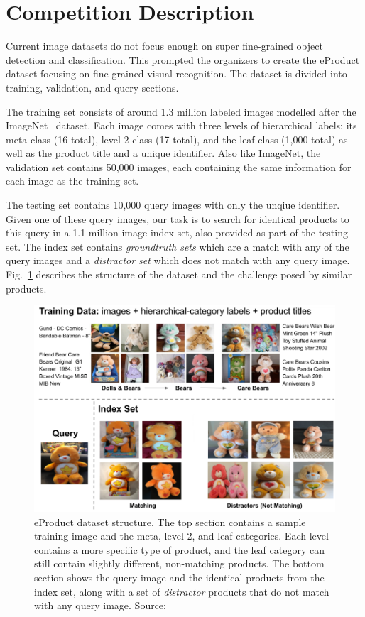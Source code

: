 \documentclass[conference]{IEEEtran}
\begin{document}
\section{Competition Description}
\label{sec:description}
Current image datasets do not focus enough on super fine-grained object detection and classification.
This prompted the organizers to create the eProduct dataset focusing on fine-grained
visual recognition.
The dataset is divided into training, validation, and query sections. 

The training set consists of around 1.3 million labeled images modelled after the ImageNet~\cite{deng2009imagenet} dataset.
Each image comes with three levels of hierarchical labels: its meta class (16 total), level 2 class (17 total),
and the leaf class (1,000 total) as well as the product title and a unique identifier.
Also like ImageNet, the validation set contains 50,000 images, each containing the same information 
for each image as the training set.

The testing set contains 10,000 query images with only the unqiue identifier.
Given one of these query images, our task is to search for identical products to this query in a 1.1 million image index set, also provided
as part of the testing set.
The index set contains \emph{groundtruth sets} which are a match with any of the query images and 
a \emph{distractor set} which does not match with any query image.
Fig.~\ref{fig:structure} describes the structure of the dataset and the challenge posed by similar products.

\begin{figure}[!t]
\centering
\includegraphics[scale=0.25]{structure}
\caption{eProduct dataset structure. The top section contains a sample training image and the meta,
level 2, and leaf categories. Each level contains a more specific type of product, and the leaf category
can still contain slightly different, non-matching products. 
The bottom section shows the query image and the identical products from the index set, along with a set 
of \emph{distractor} products that do not match with any query image.
Source:~\cite{jiangbo2021ebay}}

\label{fig:structure}
\end{figure}
\end{document}
